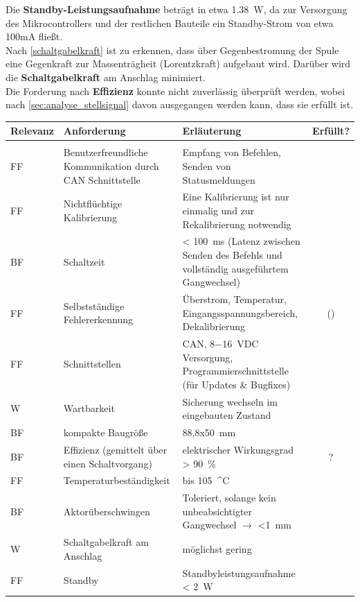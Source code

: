 Die \textbf{Standby-Leistungsaufnahme} beträgt in etwa \SI{1,38}{W}, da zur Versorgung des Mikrocontrollers und der restlichen Bauteile ein Standby-Strom von etwa 100mA fließt.\\
Nach \autoref{schaltgabelkraft} ist zu erkennen, dass über Gegenbestromung der Spule eine Gegenkraft zur Massenträgheit (Lorentzkraft) aufgebaut wird. Darüber wird die \textbf{Schaltgabelkraft} am Anschlag minimiert.\\
Die Forderung nach \textbf{Effizienz} konnte nicht zuverlässig überprüft werden, wobei nach \autoref{sec:analyse_stellsignal} davon ausgegangen werden kann, dass sie erfüllt ist.
\begin{table}[h]
	\centering
		\begin{tabular}{l|p{5cm}|p{7cm}|c}
			\textbf{Relevanz} & \textbf{Anforderung} & \textbf{Erläuterung} & Erfüllt?\\ \hline
			& &\\
			FF & Benutzerfreundliche Kommunikation durch CAN Schnittstelle & Empfang von Befehlen, Senden von Statusmeldungen & \checkmark\\ \hline
			FF & Nichtflüchtige Kalibrierung & Eine Kalibrierung ist nur einmalig und zur Rekalibrierung notwendig& \checkmark\\ \hline
			BF & Schaltzeit & < \SI{100}{ms} (Latenz zwischen Senden des Befehls und vollständig ausgeführtem Gangwechsel)& \checkmark\\ \hline
			FF & Selbstständige Fehlererkennung & Überstrom, Temperatur, Eingangsspannungsbereich, Dekalibrierung& (\checkmark) \\ \hline
			FF & Schnittstellen & CAN, \SI{8-16}{VDC} Versorgung, Programmierschnittstelle (für Updates \& Bugfixes)& \checkmark \\ \hline
			W & Wartbarkeit & Sicherung wechseln im eingebauten Zustand& \checkmark\\ \hline
			BF & kompakte Baugröße & 88,8x\SI{50}{mm}&\checkmark \\ \hline
			BF & Effizienz (gemittelt über einen Schaltvorgang) & elektrischer Wirkungsgrad > \SI{90}{\%} & ?\\ \hline
			FF & Temperaturbeständigkeit & bis \SI{105}{^\circ C}& \checkmark \\ \hline
			BF & Aktorüberschwingen & Toleriert, solange kein unbeabsichtigter Gangwechsel $\rightarrow$ \SI{<1}{mm}& \checkmark
			\\ \hline
			W & Schaltgabelkraft am Anschlag & möglichst gering& \checkmark \\ \hline
			FF & Standby & Standbyleistungsaufnahme < \SI{2}{W}& \checkmark \\ \hline
		\end{tabular}
	\label{tab:Anforderungsliste2}
\end{table}
